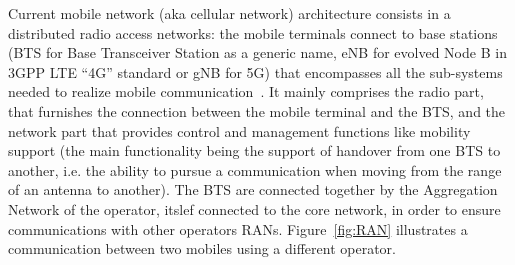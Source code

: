 Current mobile network (aka cellular network) architecture consists in a distributed radio access networks: the mobile terminals connect to base stations (BTS for Base Transceiver Station as a generic name, eNB for evolved Node B in 3GPP LTE “4G” standard or gNB for 5G) that encompasses all the sub-systems needed to realize mobile communication~\cite{bouguen2012lte}. It mainly comprises the radio part, that furnishes the connection between the mobile terminal and the BTS, and the network part that provides control and management functions like mobility support (the main functionality being the support of handover from one BTS to another, i.e. the ability to pursue a communication when moving from the range of an antenna to another).
The BTS are connected together by the Aggregation Network of the operator, itslef connected to the core network, in order to ensure communications with other operators RANs. Figure~\ref{fig:RAN} illustrates a communication between two mobiles using a different operator.

